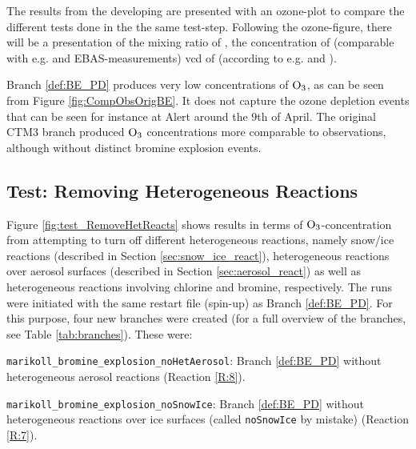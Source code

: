 The results from the developing are presented with an ozone-plot to compare the different tests done in the the same test-step. Following the ozone-figure, there will be a presentation of the mixing ratio of , the concentration of  (comparable with e.g. \cite{barrie} and EBAS-measurements) \acrlong{vcd} of  (according to e.g. \cite{Peterson2015} and \cite{Simpson2017}).

\medskip

Branch \ref{def:BE_PD} produces very low concentrations of $\mathrm{O_3}$, as can be seen from Figure \ref{fig:CompObsOrigBE}. It does not capture the ozone depletion events that can be seen for instance at Alert around the 9th of April. The original CTM3 branch produced $\mathrm{O_3}$ concentrations more comparable to observations, although without distinct bromine explosion events. 





\subsection{Test: Removing Heterogeneous Reactions}

Figure \ref{fig:test_RemoveHetReacts} shows results in terms of $\mathrm{O_3}$-concentration from attempting to turn off different heterogeneous reactions, namely snow/ice reactions (described in Section \ref{sec:snow_ice_react}), heterogeneous reactions over aerosol surfaces (described in Section \ref{sec:aerosol_react}) as well as heterogeneous reactions involving chlorine and bromine, respectively. The runs were initiated with the same restart file (spin-up) as Branch \ref{def:BE_PD}. For this purpose, four new branches were created (for a full overview of the branches, see Table \ref{tab:branches}). These were:

\begin{mydef}\label{def:BE_PD_noAerosol}
    \texttt{marikoll\_bromine\_explosion\_noHetAerosol}: Branch \ref{def:BE_PD} without heterogeneous aerosol reactions (Reaction \ref{R:8}). 
\end{mydef}

\begin{mydef}\label{def:BE_PD_noIce}
    \texttt{marikoll\_bromine\_explosion\_noSnowIce}: Branch \ref{def:BE_PD} without heterogeneous reactions over ice surfaces (called \texttt{noSnowIce} by mistake) (Reaction \ref{R:7}).
\end{mydef}

